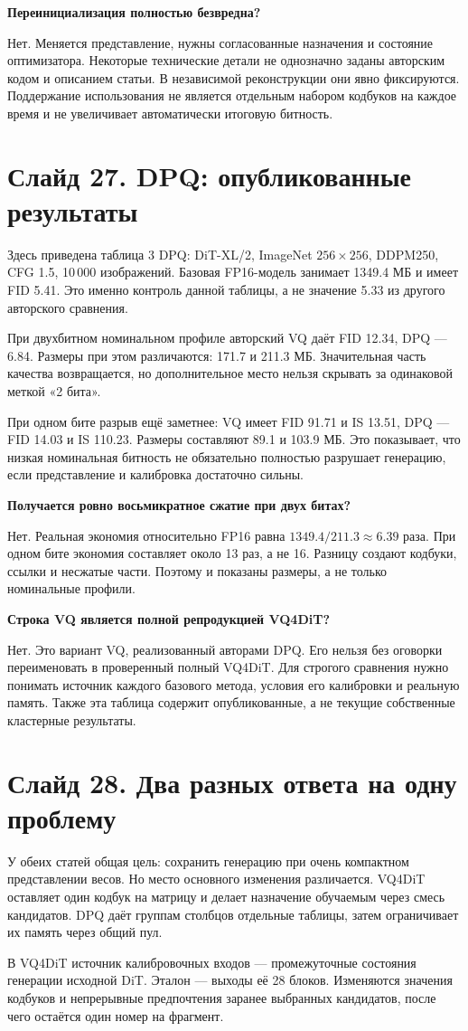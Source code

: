\documentclass[a4paper,11pt]{article}
\newcommand{\slide}[2]{\clearpage\section*{Слайд #1. #2}}
\newcommand{\question}[1]{\par\textbf{#1}\par}
\begin{document}
\question{Переинициализация полностью безвредна?}
Нет. Меняется представление, нужны согласованные
назначения и состояние оптимизатора.
Некоторые технические детали не однозначно
заданы авторским кодом и описанием статьи.
В независимой реконструкции они явно фиксируются.
Поддержание использования не является отдельным
набором кодбуков на каждое время и не увеличивает
автоматически итоговую битность.

\slide{27}{DPQ: опубликованные результаты}
Здесь приведена таблица 3 DPQ: DiT-XL/2,
ImageNet $256\times256$, DDPM250, CFG 1.5,
10\,000 изображений. Базовая FP16-модель
занимает 1349.4 МБ и имеет FID 5.41.
Это именно контроль данной таблицы,
а не значение 5.33 из другого авторского сравнения.

При двухбитном номинальном профиле авторский
VQ даёт FID 12.34, DPQ --- 6.84.
Размеры при этом различаются: 171.7
и 211.3 МБ. Значительная часть качества
возвращается, но дополнительное место
нельзя скрывать за одинаковой меткой «2 бита».

При одном бите разрыв ещё заметнее:
VQ имеет FID 91.71 и IS 13.51,
DPQ --- FID 14.03 и IS 110.23.
Размеры составляют 89.1 и 103.9 МБ.
Это показывает, что низкая номинальная битность
не обязательно полностью разрушает генерацию,
если представление и калибровка достаточно сильны.

\question{Получается ровно восьмикратное сжатие при двух битах?}
Нет. Реальная экономия относительно FP16
равна $1349.4/211.3\approx6.39$ раза.
При одном бите экономия составляет около 13 раз,
а не 16. Разницу создают кодбуки, ссылки
и несжатые части. Поэтому и показаны размеры,
а не только номинальные профили.

\question{Строка VQ является полной репродукцией VQ4DiT?}
Нет. Это вариант VQ, реализованный авторами DPQ.
Его нельзя без оговорки переименовать в
проверенный полный VQ4DiT. Для строгого сравнения
нужно понимать источник каждого базового метода,
условия его калибровки и реальную память.
Также эта таблица содержит опубликованные,
а не текущие собственные кластерные результаты.

\slide{28}{Два разных ответа на одну проблему}
У обеих статей общая цель: сохранить генерацию
при очень компактном представлении весов.
Но место основного изменения различается.
VQ4DiT оставляет один кодбук на матрицу
и делает назначение обучаемым через смесь кандидатов.
DPQ даёт группам столбцов отдельные таблицы,
затем ограничивает их память через общий пул.

В VQ4DiT источник калибровочных входов ---
промежуточные состояния генерации исходной DiT.
Эталон --- выходы её 28 блоков.
Изменяются значения кодбуков и непрерывные
предпочтения заранее выбранных кандидатов,
после чего остаётся один номер на фрагмент.
\end{document}
